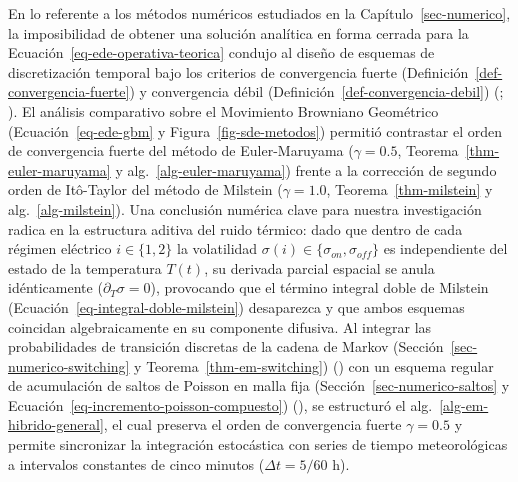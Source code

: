 \documentclass[
  spanish,
  letterpaper,
  DIV=11,
  numbers=noendperiod]{scrreprt}
\theoremstyle{plain}
\theoremstyle{plain}
\theoremstyle{plain}
\theoremstyle{definition}
\theoremstyle{remark}
\begin{document}
En lo referente a los métodos numéricos estudiados en la
Capítulo~\ref{sec-numerico}, la imposibilidad de obtener una solución
analítica en forma cerrada para la
Ecuación~\ref{eq-ede-operativa-teorica} condujo al diseño de esquemas de
discretización temporal bajo los criterios de convergencia fuerte
(Definición~\ref{def-convergencia-fuerte}) y convergencia débil
(Definición~\ref{def-convergencia-debil})
(;
). El análisis comparativo
sobre el Movimiento Browniano Geométrico (Ecuación~\ref{eq-ede-gbm} y
Figura~\ref{fig-sde-metodos}) permitió contrastar el orden de
convergencia fuerte del método de Euler-Maruyama (\(\gamma = 0.5\),
Teorema~\ref{thm-euler-maruyama} y alg.~\ref{alg-euler-maruyama}) frente
a la corrección de segundo orden de Itô-Taylor del método de Milstein
(\(\gamma = 1.0\), Teorema~\ref{thm-milstein} y
alg.~\ref{alg-milstein}). Una conclusión numérica clave para nuestra
investigación radica en la estructura aditiva del ruido térmico: dado
que dentro de cada régimen eléctrico \(i \in \{1, 2\}\) la volatilidad
\(\sigma(i) \in \{\sigma_{on}, \sigma_{off}\}\) es independiente del
estado de la temperatura \(T(t)\), su derivada parcial espacial se anula
idénticamente (\(\partial_T \sigma = 0\)), provocando que el término
integral doble de Milstein (Ecuación~\ref{eq-integral-doble-milstein})
desaparezca y que ambos esquemas coincidan algebraicamente en su
componente difusiva. Al integrar las probabilidades de transición
discretas de la cadena de Markov (Sección~\ref{sec-numerico-switching} y
Teorema~\ref{thm-em-switching}) () con un esquema regular de acumulación de saltos de Poisson en
malla fija (Sección~\ref{sec-numerico-saltos} y
Ecuación~\ref{eq-incremento-poisson-compuesto})
(), se
estructuró el alg.~\ref{alg-em-hibrido-general}, el cual preserva el
orden de convergencia fuerte \(\gamma = 0.5\) y permite sincronizar la
integración estocástica con series de tiempo meteorológicas a intervalos
constantes de cinco minutos (\(\Delta t = 5/60\text{ h}\)).
\end{document}

